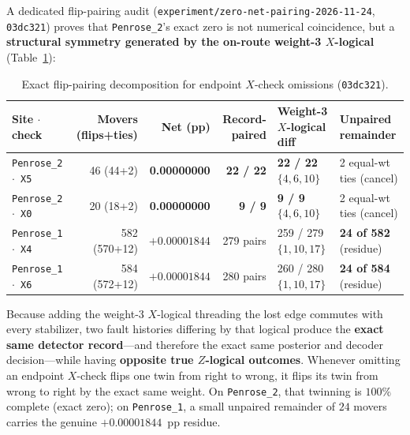 \documentclass[11pt,a4paper]{article}
\begin{document}
A dedicated flip-pairing audit (\texttt{experiment/zero-net-pairing-2026-11-24}, \texttt{03dc321}) proves that \texttt{Penrose\_2}'s exact zero is not numerical coincidence, but a \textbf{structural symmetry generated by the on-route weight-3 $X$-logical} (Table~\ref{tab:pairing}):

\begin{table}[h]
\centering
\caption{Exact flip-pairing decomposition for endpoint $X$-check omissions (\texttt{03dc321}).}
\label{tab:pairing}
\begin{tabular}{lrrrll}
\toprule
Site $\cdot$ check & Movers (flips+ties) & Net (pp) & Record-paired & Weight-3 $X$-logical diff & Unpaired remainder \\
\midrule
\texttt{Penrose\_2 $\cdot$ X5} & 46 (44+2) & \textbf{0.00000000} & \textbf{22 / 22} & \textbf{22 / 22} $\{4,6,10\}$ & 2 equal-wt ties (cancel) \\
\texttt{Penrose\_2 $\cdot$ X0} & 20 (18+2) & \textbf{0.00000000} & \textbf{9 / 9} & \textbf{9 / 9} $\{4,6,10\}$ & 2 equal-wt ties (cancel) \\
\texttt{Penrose\_1 $\cdot$ X4} & 582 (570+12) & $+0.00001844$ & 279 pairs & 259 / 279 $\{1,10,17\}$ & \textbf{24 of 582} (residue) \\
\texttt{Penrose\_1 $\cdot$ X6} & 584 (572+12) & $+0.00001844$ & 280 pairs & 260 / 280 $\{1,10,17\}$ & \textbf{24 of 584} (residue) \\
\bottomrule
\end{tabular}
\end{table}

Because adding the weight-3 $X$-logical threading the lost edge commutes with every stabilizer, two fault histories differing by that logical produce the \textbf{exact same detector record}---and therefore the exact same posterior and decoder decision---while having \textbf{opposite true $Z$-logical outcomes}. Whenever omitting an endpoint $X$-check flips one twin from right to wrong, it flips its twin from wrong to right by the exact same weight. On \texttt{Penrose\_2}, that twinning is $100\%$ complete (exact zero); on \texttt{Penrose\_1}, a small unpaired remainder of $24$ movers carries the genuine $+0.00001844$~pp residue.
\end{document}
